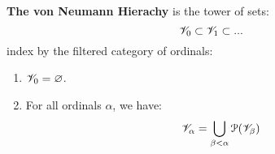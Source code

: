 \begin{enumerate}
\begin{enumerate}
                    \begin{definition} \label{def: von_neumann_hierachy}
                        \textbf{The von Neumann Hierachy} is the tower of sets:
                            $$\mathscr{V}_0 \subset \mathscr{V}_1 \subset ...$$
                        index by the filtered category of ordinals:
                            \begin{enumerate}
                                \item $\mathscr{V}_0 = \varnothing$. 
                                \item For all ordinals $\alpha$, we have:
                                    $$\mathscr{V}_{\alpha} = \bigcup_{\beta < \alpha} \mathcal{P}(\mathscr{V}_{\beta})$$
                            \end{enumerate}
                    \end{definition}
                    

\end{enumerate}
\end{enumerate}
